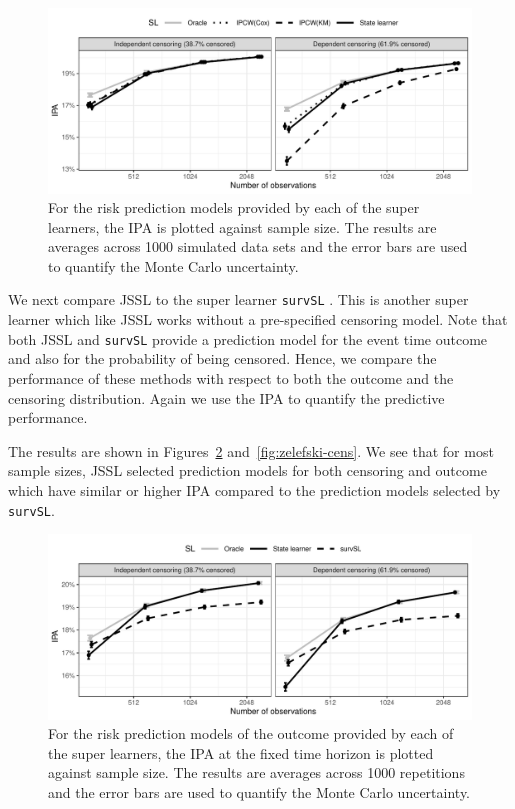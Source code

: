 \documentclass[a4paper,danish]{article}
\theoremstyle{plain} %
\numberwithin{theorem}{section}
\theoremstyle{definition} %
\theoremstyle{remark}
\newcommand{\1}{\mathds{1}}
\begin{document}
\begin{figure}
  \centering %
  \includegraphics[width=1\linewidth]{experiment-fig-sl-ipcw.pdf}
  \caption[]{For the risk prediction models provided by each of the super
    learners, the IPA is plotted against sample size. The results are averages across 
    1000 simulated data sets and the error bars are used to quantify the Monte Carlo
    uncertainty.
  }
  \label{fig:ipcw-fail}
\end{figure}

We next compare JSSL to the super learner \texttt{survSL}
\citep{westling2021inference}. This is another super learner which
like JSSL works without a pre-specified censoring
model. Note that both JSSL and \texttt{survSL} provide a
prediction model for the event time outcome and also for the
probability of being censored. Hence, we compare the performance of
these methods with respect to both the outcome and the censoring
distribution. Again we use the IPA to quantify the predictive
performance.

The results are shown in Figures~\ref{fig:zelefski-out}
and~\ref{fig:zelefski-cens}. We see that for most sample sizes, JSSL selected prediction models for both censoring and outcome which
have similar or higher IPA compared to the prediction models selected
by \texttt{survSL}.
\begin{figure}
  \centering %
  \includegraphics[width=1\linewidth]{experiment-fig-sl-survSL-out.pdf}
  \caption[]{For the risk prediction models of the outcome provided by each
    of the super learners, the IPA at the fixed time horizon is plotted against
    sample size. The results are averages across 1000 repetitions and the error
    bars are used to quantify the Monte Carlo uncertainty.}
  \label{fig:zelefski-out}
\end{figure}
\end{document}

